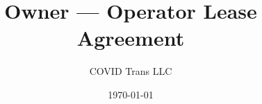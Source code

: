 
\title{Owner --- Operator Lease Agreement}
\author{COVID Trans LLC}
\date{\today}


\makeatletter

    \renewcommand{\maketitle}{%
        \noindent%
        \begin{center}
            {%
                \LARGE%
                \bfseries%
                \scshape%
                \underline{\@title}
            } \\
            \vspace{0.5em}
            {
                \Large%
                \textbf{\@author}%
            }
            \vspace{1em}
        \end{center}
    }

\makeatother